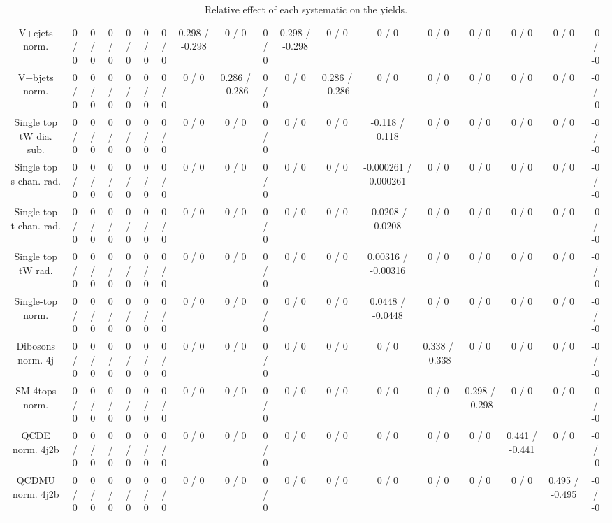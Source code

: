 \documentclass[10pt]{article}
\begin{document}
\begin{table}[htbp]
\begin{center}
\begin{tabular}{|c|c|c|c|c|c|c|c|c|c|c|c|c|c|c|c|c|c|}
  V+cjets norm. & 0 / 0 & 0 / 0 & 0 / 0 & 0 / 0 & 0 / 0 & 0 / 0 & 0.298 / -0.298 & 0 / 0 & 0 / 0 & 0.298 / -0.298 & 0 / 0 & 0 / 0 & 0 / 0 & 0 / 0 & 0 / 0 & 0 / 0 & -0 / -0 \\ 
  V+bjets norm. & 0 / 0 & 0 / 0 & 0 / 0 & 0 / 0 & 0 / 0 & 0 / 0 & 0 / 0 & 0.286 / -0.286 & 0 / 0 & 0 / 0 & 0.286 / -0.286 & 0 / 0 & 0 / 0 & 0 / 0 & 0 / 0 & 0 / 0 & -0 / -0 \\ 
  Single top tW dia. sub. & 0 / 0 & 0 / 0 & 0 / 0 & 0 / 0 & 0 / 0 & 0 / 0 & 0 / 0 & 0 / 0 & 0 / 0 & 0 / 0 & 0 / 0 & -0.118 / 0.118 & 0 / 0 & 0 / 0 & 0 / 0 & 0 / 0 & -0 / -0 \\ 
  Single top s-chan. rad. & 0 / 0 & 0 / 0 & 0 / 0 & 0 / 0 & 0 / 0 & 0 / 0 & 0 / 0 & 0 / 0 & 0 / 0 & 0 / 0 & 0 / 0 & -0.000261 / 0.000261 & 0 / 0 & 0 / 0 & 0 / 0 & 0 / 0 & -0 / -0 \\ 
  Single top t-chan. rad. & 0 / 0 & 0 / 0 & 0 / 0 & 0 / 0 & 0 / 0 & 0 / 0 & 0 / 0 & 0 / 0 & 0 / 0 & 0 / 0 & 0 / 0 & -0.0208 / 0.0208 & 0 / 0 & 0 / 0 & 0 / 0 & 0 / 0 & -0 / -0 \\ 
  Single top tW rad. & 0 / 0 & 0 / 0 & 0 / 0 & 0 / 0 & 0 / 0 & 0 / 0 & 0 / 0 & 0 / 0 & 0 / 0 & 0 / 0 & 0 / 0 & 0.00316 / -0.00316 & 0 / 0 & 0 / 0 & 0 / 0 & 0 / 0 & -0 / -0 \\ 
  Single-top norm. & 0 / 0 & 0 / 0 & 0 / 0 & 0 / 0 & 0 / 0 & 0 / 0 & 0 / 0 & 0 / 0 & 0 / 0 & 0 / 0 & 0 / 0 & 0.0448 / -0.0448 & 0 / 0 & 0 / 0 & 0 / 0 & 0 / 0 & -0 / -0 \\ 
  Dibosons norm. 4j & 0 / 0 & 0 / 0 & 0 / 0 & 0 / 0 & 0 / 0 & 0 / 0 & 0 / 0 & 0 / 0 & 0 / 0 & 0 / 0 & 0 / 0 & 0 / 0 & 0.338 / -0.338 & 0 / 0 & 0 / 0 & 0 / 0 & -0 / -0 \\ 
  SM 4tops norm. & 0 / 0 & 0 / 0 & 0 / 0 & 0 / 0 & 0 / 0 & 0 / 0 & 0 / 0 & 0 / 0 & 0 / 0 & 0 / 0 & 0 / 0 & 0 / 0 & 0 / 0 & 0.298 / -0.298 & 0 / 0 & 0 / 0 & -0 / -0 \\ 
  QCDE norm. 4j2b & 0 / 0 & 0 / 0 & 0 / 0 & 0 / 0 & 0 / 0 & 0 / 0 & 0 / 0 & 0 / 0 & 0 / 0 & 0 / 0 & 0 / 0 & 0 / 0 & 0 / 0 & 0 / 0 & 0.441 / -0.441 & 0 / 0 & -0 / -0 \\ 
  QCDMU norm. 4j2b & 0 / 0 & 0 / 0 & 0 / 0 & 0 / 0 & 0 / 0 & 0 / 0 & 0 / 0 & 0 / 0 & 0 / 0 & 0 / 0 & 0 / 0 & 0 / 0 & 0 / 0 & 0 / 0 & 0 / 0 & 0.495 / -0.495 & -0 / -0 \\ 
\hline 
\end{tabular} 
\caption{Relative effect of each systematic on the yields.} 
\end{center} 
\end{table} 
\end{document}
